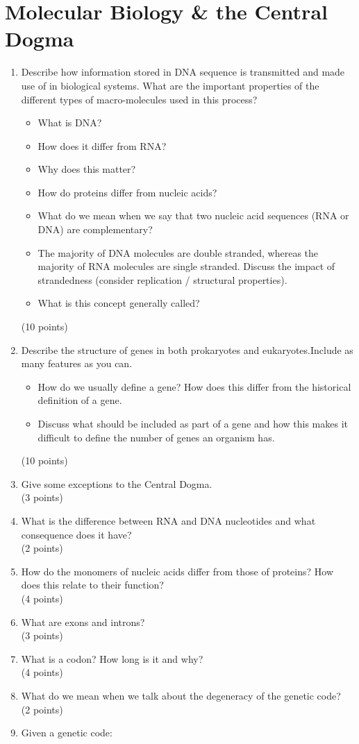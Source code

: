 \documentclass[11pt]{article}
\begin{document}
\section{Molecular Biology \& the Central Dogma}  
\begin{enumerate}
\item Describe how information stored in DNA sequence is transmitted and made use of in biological
  systems. What are the important properties of the different types of
  macro-molecules used in this process?
  \begin{itemize}
    \item What is DNA?
    \item How does it differ from RNA?
    \item Why does this matter?
    \item How do proteins differ from nucleic acids?
    \item What do we mean when we say that two nucleic acid sequences (RNA or
      DNA) are complementary?
    \item The majority of DNA molecules are double stranded, whereas the
      majority of RNA molecules are single stranded. Discuss the impact of
      strandedness (consider replication / structural properties).
    \item What is this concept generally called?
  \end{itemize}
  (10 points)
\item Describe the structure of genes in both prokaryotes and
  eukaryotes.Include as many features as you can.
  \begin{itemize}
  \item How do we usually define a gene? How does this differ
    from the historical definition of a gene.
  \item Discuss what should be included as part of a gene
    and how this makes it difficult to define the number of genes an organism
    has.
  \end{itemize}
  (10 points)
\item Give some exceptions to the Central Dogma.\\
(3 points)
\item What is the difference between RNA and DNA nucleotides and what
  consequence does it have?\\
(2 points)
\item How do the monomers of nucleic acids differ from those of proteins? How
  does this relate to their function?\\
(4 points)
\item What are exons and introns?\\
(3 points)
\item What is a codon? How long is it and why?\\
(4 points)
\item What do we mean when we talk about the degeneracy of the genetic code?\\
(2 points)
\item Given a genetic code:\\
  \begin{minipage}{0.6\textwidth}
  {\tiny
    
  }
  \end{minipage}


\end{enumerate}
\end{document}

